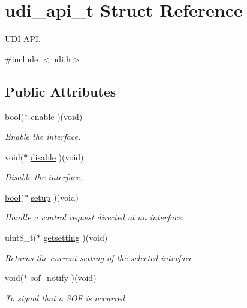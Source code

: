 \hypertarget{structudi__api__t}{\section{udi\-\_\-api\-\_\-t Struct Reference}
\label{structudi__api__t}
}


U\-D\-I A\-P\-I.  




{\ttfamily \#include $<$udi.\-h$>$}

\subsection*{Public Attributes}
\begin{DoxyCompactItemize}
\item 
\hyperlink{group__group__xmega__utils_ga97a80ca1602ebf2303258971a2c938e2}{bool}($\ast$ \hyperlink{structudi__api__t_a293117d7192553f153e0411b346dadc1}{enable} )(void)
\begin{DoxyCompactList}\small\item\em Enable the interface. \end{DoxyCompactList}\item 
void($\ast$ \hyperlink{structudi__api__t_ab0ceaf0d506a357091ec69d5868bff7d}{disable} )(void)
\begin{DoxyCompactList}\small\item\em Disable the interface. \end{DoxyCompactList}\item 
\hyperlink{group__group__xmega__utils_ga97a80ca1602ebf2303258971a2c938e2}{bool}($\ast$ \hyperlink{structudi__api__t_a8161cf3c75c90f630f7d1ee931be821d}{setup} )(void)
\begin{DoxyCompactList}\small\item\em Handle a control request directed at an interface. \end{DoxyCompactList}\item 
uint8\-\_\-t($\ast$ \hyperlink{structudi__api__t_ad2b798a7cb160d55ed92162ecb845f97}{getsetting} )(void)
\begin{DoxyCompactList}\small\item\em Returns the current setting of the selected interface. \end{DoxyCompactList}\item 
\hypertarget{structudi__api__t_ab1dc2a8393441c196b1f5a93e9535f8e}{void($\ast$ \hyperlink{structudi__api__t_ab1dc2a8393441c196b1f5a93e9535f8e}{sof\-\_\-notify} )(void)}\label{structudi__api__t_ab1dc2a8393441c196b1f5a93e9535f8e}

\begin{DoxyCompactList}\small\item\em To signal that a S\-O\-F is occurred. \end{DoxyCompactList}\end{DoxyCompactItemize}



